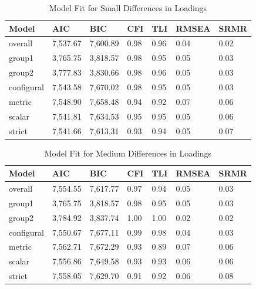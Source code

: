 \documentclass[
  man]{apa6}
\begin{document}
\begin{table}[tbp]

\begin{center}
\begin{threeparttable}

\caption{\label{tab:tab2}Model Fit for Small Differences in Loadings}

\begin{tabular}{lllllll}
\toprule
Model & AIC & BIC & CFI & TLI & RMSEA & SRMR\\
\midrule
overall & 7,537.67 & 7,600.89 & 0.98 & 0.96 & 0.04 & 0.02\\
group1 & 3,765.75 & 3,818.57 & 0.98 & 0.95 & 0.05 & 0.03\\
group2 & 3,777.83 & 3,830.66 & 0.98 & 0.96 & 0.05 & 0.03\\
configural & 7,543.58 & 7,670.02 & 0.98 & 0.95 & 0.05 & 0.03\\
metric & 7,548.90 & 7,658.48 & 0.94 & 0.92 & 0.07 & 0.06\\
scalar & 7,541.81 & 7,634.53 & 0.95 & 0.95 & 0.05 & 0.06\\
strict & 7,541.66 & 7,613.31 & 0.93 & 0.94 & 0.05 & 0.07\\
\bottomrule
\end{tabular}

\end{threeparttable}
\end{center}

\end{table}

\begin{table}[tbp]

\begin{center}
\begin{threeparttable}

\caption{\label{tab:tab3}Model Fit for Medium Differences in Loadings}

\begin{tabular}{lllllll}
\toprule
Model & AIC & BIC & CFI & TLI & RMSEA & SRMR\\
\midrule
overall & 7,554.55 & 7,617.77 & 0.97 & 0.94 & 0.05 & 0.03\\
group1 & 3,765.75 & 3,818.57 & 0.98 & 0.95 & 0.05 & 0.03\\
group2 & 3,784.92 & 3,837.74 & 1.00 & 1.00 & 0.02 & 0.02\\
configural & 7,550.67 & 7,677.11 & 0.99 & 0.98 & 0.04 & 0.03\\
metric & 7,562.71 & 7,672.29 & 0.93 & 0.89 & 0.07 & 0.06\\
scalar & 7,556.86 & 7,649.58 & 0.93 & 0.93 & 0.06 & 0.06\\
strict & 7,558.05 & 7,629.70 & 0.91 & 0.92 & 0.06 & 0.08\\
\bottomrule
\end{tabular}

\end{threeparttable}
\end{center}

\end{table}
\end{document}
